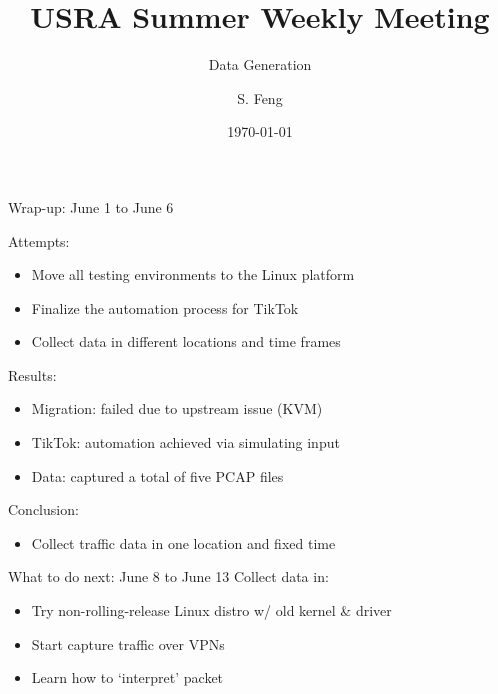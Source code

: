 \documentclass{beamer}
\title[Weekly Meeting]{
    USRA Summer Weekly Meeting
}
\subtitle[]{Data Generation}
\author[Shuo Feng]{S. Feng}
\institute[NIMS Lab]{
  NIMS Lab\\
  USRA Summer 2023}
\date{\today}
\begin{document}
\frame{\titlepage}

\begin{frame}{Wrap-up: June 1 to June 6}

  Attempts:
  \begin{itemize}
    \item Move all testing environments to the Linux platform
    \item Finalize the automation process for TikTok
    \item Collect data in different locations and time frames
  \end{itemize}

  Results:
  \begin{itemize}
    \item Migration: failed due to upstream issue (KVM)
    \item TikTok: automation achieved via simulating input
    \item Data: captured a total of five PCAP files
  \end{itemize}

  Conclusion:
  \begin{itemize}
    \item Collect traffic data in one location and fixed time
  \end{itemize}

\end{frame}

\begin{frame}{What to do next: June 8 to June 13}
  Collect data in:
  \begin{itemize}
    \item Try non-rolling-release Linux distro w/ old kernel \& driver
    \item Start capture traffic over VPNs
    \item Learn how to `interpret' packet
  \end{itemize}
\end{frame}
\end{document}
